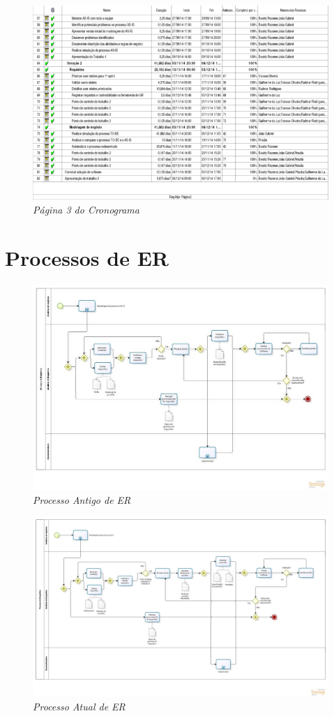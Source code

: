 \begin{apendicesenv}
\begin{figure}[H]
\centering\includegraphics[scale=0.5]{figuras/cronograma3.png}
\caption{\textit{Página 3 do Cronograma}}
\end{figure}

\chapter{Processos de ER}

\begin{figure}[H]
\centering\includegraphics[scale=0.5]{figuras/processoAntigo}
\caption{\textit{Processo Antigo de ER}}
\end{figure}

\begin{figure}[H]
\centering\includegraphics[scale=0.3]{figuras/processoAtual}
\caption{\textit{Processo Atual de ER}}
\end{figure}

\end{apendicesenv}

